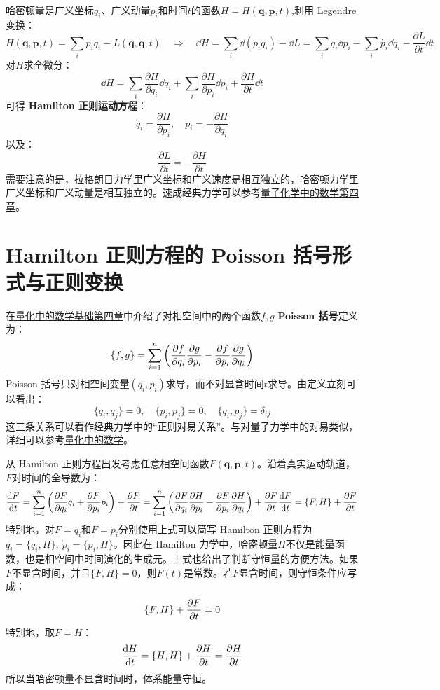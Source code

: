 哈密顿量是广义坐标$q_i$、广义动量$p_i$和时间$t$的函数$H=H(\mathbf{q},\mathbf{p},t)$,利用 Legendre 变换：
\[H(\mathbf{q},\mathbf{p},t)=\sum_ip_iq_i-L(\mathbf{q},\dot{\mathbf{q}},t) \quad \Rightarrow \quad \dd{H}=\sum_i\dd\left(p_iq_i\right)-\dd{L}=\sum_i\dot{q}_i\dd{p_i}-\sum_i\dot{p_i}\dd{q_i}-\frac{\partial L}{\partial t}\dd{t}\]
对$H$求全微分：
\[\dd{H}=\sum_i\frac{\partial H}{\partial q_i}\dd{q_i}+\sum_i\frac{\partial H}{\partial p_i}\dd{p_i}+\frac{\partial H}{\partial t}\dd{t}\]
可得\textbf{ Hamilton 正则运动方程}：
\[\dot{q}_i=\frac{\partial H}{\partial p_i}, \quad \dot{p}_i=-\frac{\partial H}{\partial q_i}\]
以及：
\[\frac{\partial L}{\partial t}=-\frac{\partial H}{\partial t}\]
需要注意的是，拉格朗日力学里广义坐标和广义速度是相互独立的，哈密顿力学里广义坐标和广义动量是相互独立的。速成经典力学可以参考\href{https://github.com/Astolfo-Official/Baby-Math-on-Quantum-Chemistry/blob/main/%E3%80%8A%E9%87%8F%E5%AD%90%E5%8C%96%E5%AD%A6%E4%B8%AD%E7%9A%84%E6%95%B0%E5%AD%A6%E3%80%8B2.0.pdf}{量子化学中的数学第四章}。

\section{Hamilton 正则方程的 Poisson 括号形式与正则变换}
在\href{https://github.com/Astolfo-Official/Baby-Math-on-Quantum-Chemistry/blob/main/%E3%80%8A%E9%87%8F%E5%AD%90%E5%8C%96%E5%AD%A6%E4%B8%AD%E7%9A%84%E6%95%B0%E5%AD%A6%E3%80%8B2.0.pdf}{量化中的数学基础第四章}中介绍了对相空间中的两个函数$f, g$\textbf{ Poisson 括号}定义为：
\[\{f,g\}=\sum_{i=1}^{n}\left(\pdv{f}{q_i}\pdv{g}{p_i}-\pdv{f}{p_i}\pdv{g}{q_i}\right)\]
Poisson 括号只对相空间变量$(q_i,p_i)$求导，而不对显含时间$t$求导。由定义立刻可以看出：
\[\{q_i,q_j\}=0,\quad \{p_i,p_j\}=0,\quad \{q_i,p_j\}=\delta_{ij}\]
这三条关系可以看作经典力学中的“正则对易关系”。与对量子力学中的对易类似，详细可以参考\href{https://github.com/Astolfo-Official/Baby-Math-on-Quantum-Chemistry/blob/main/%E3%80%8A%E9%87%8F%E5%AD%90%E5%8C%96%E5%AD%A6%E4%B8%AD%E7%9A%84%E6%95%B0%E5%AD%A6%E3%80%8B2.0.pdf}{量化中的数学}。

从 Hamilton 正则方程出发考虑任意相空间函数$F(\mathbf{q},\mathbf{p},t)$。沿着真实运动轨道，$F$对时间的全导数为：
\[\dv{F}{t}=\sum_{i=1}^{n}\left(\pdv{F}{q_i}\dot{q}_i+\pdv{F}{p_i}\dot{p}_i\right)+\pdv{F}{t}=\sum_{i=1}^{n}\left(\pdv{F}{q_i}\pdv{H}{p_i}-\pdv{F}{p_i}\pdv{H}{q_i}\right)+\pdv{F}{t}\dv{F}{t}=\{F,H\}+\pdv{F}{t}\]
特别地，对$F=q_i$和$F=p_i$分别使用上式可以简写 Hamilton 正则方程为$\dot{q}_i=\{q_i,H\}, \ \dot{p}_i=\{p_i,H\}$。因此在 Hamilton 力学中，哈密顿量$H$不仅是能量函数，也是相空间中时间演化的生成元。上式也给出了判断守恒量的方便方法。如果$F$不显含时间，并且$\{F,H\}=0$，则$F(t)$是常数。若$F$显含时间，则守恒条件应写成：
\[\{F,H\}+\pdv{F}{t}=0\]
特别地，取$F=H$：
\[\dv{H}{t}=\{H,H\}+\pdv{H}{t}=\pdv{H}{t}\]
所以当哈密顿量不显含时间时，体系能量守恒。

